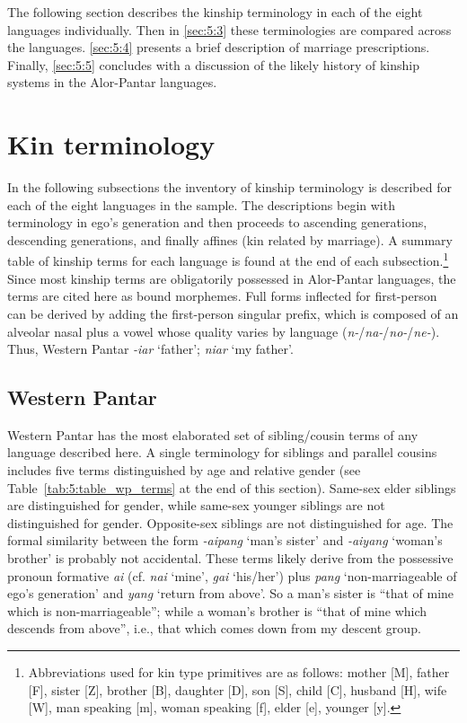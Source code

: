 The following section describes the kinship terminology in each of the eight languages individually. Then in {\SS} \ref{sec:5:3} these terminologies are compared across the languages. {\SS} \ref{sec:5:4} presents a brief description of marriage prescriptions. Finally, {\SS} \ref{sec:5:5} concludes with a discussion of the likely history of kinship systems in the Alor-Pantar languages. 


\section{Kin terminology}\label{sec:5:2}
In the following subsections the inventory of kinship terminology is described for each of the eight languages in the sample. The descriptions begin with terminology in ego's generation and then proceeds to ascending generations, descending generations, and finally affines (kin related by marriage). A summary table of kinship terms for each language is found at the end of each subsection.\footnote{Abbreviations used for kin type primitives are as follows: mother [M], father [F], sister [Z], brother [B], daughter [D], son [S], child [C], husband [H], wife [W], man speaking [m], woman speaking [f], elder [e], younger [y].}   Since most kinship terms are obligatorily possessed in Alor-Pantar languages, the terms are cited here as bound morphemes. Full forms inflected for first-person can be derived by adding the first-person singular prefix, which is composed of an alveolar nasal plus a vowel whose quality varies by language (\textit{n-}/\textit{na-}/\textit{no-}/\textit{ne-}). Thus, Western Pantar \textit{-iar} `father'; \textit{niar} `my father'.

\subsection{Western Pantar}\label{sect_wp}
Western Pantar has the most elaborated set of sibling/cousin terms of any language described here. A single terminology for siblings and parallel cousins includes five terms distinguished by age and relative gender (see Table~\ref{tab:5:table_wp_terms} at the end of this section). Same-sex elder siblings are distinguished for gender, while same-sex younger siblings are not distinguished for gender. Opposite-sex siblings are not distinguished for age. The formal similarity between the form \textit{-aipang} `man's sister' and \textit{-aiyang} `woman's brother' is probably not accidental. These terms likely derive from the possessive pronoun formative \textit{ai} (cf. \textit{nai} `mine', \textit{gai} `his/her') plus \textit{pang} `non-marriageable of ego's generation' and \textit{yang} `return from above'. So a man's sister is ``that of mine which is non-marriageable''; while a woman's brother is ``that of mine which descends from above'', i.e., that which comes down from my descent group. 

